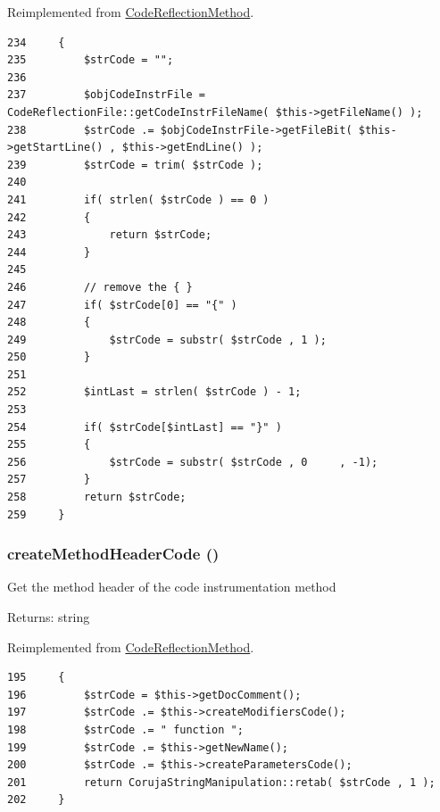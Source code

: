 Reimplemented from \hyperlink{class_code_reflection_method_e38c2891dc093dabb6b363a4de9ac495}{CodeReflectionMethod}.

\begin{Code}\begin{verbatim}234     {
235         $strCode = "";
236 
237         $objCodeInstrFile = CodeReflectionFile::getCodeInstrFileName( $this->getFileName() );
238         $strCode .= $objCodeInstrFile->getFileBit( $this->getStartLine() , $this->getEndLine() );
239         $strCode = trim( $strCode );
240 
241         if( strlen( $strCode ) == 0 )
242         {
243             return $strCode;
244         }
245         
246         // remove the { }
247         if( $strCode[0] == "{" )
248         {
249             $strCode = substr( $strCode , 1 );
250         }
251 
252         $intLast = strlen( $strCode ) - 1;
253 
254         if( $strCode[$intLast] == "}" )
255         {
256             $strCode = substr( $strCode , 0     , -1);
257         }
258         return $strCode;
259     }
\end{verbatim}
\end{Code}


\hypertarget{class_code_instrumentation_method_3d517292204047acfc6bb54cc09a38e3}{
\subsubsection[{createMethodHeaderCode}]{\setlength{\rightskip}{0pt plus 5cm}createMethodHeaderCode ()}}
\label{class_code_instrumentation_method_3d517292204047acfc6bb54cc09a38e3}


Get the method header of the code instrumentation method

\begin{Desc}
\item[Returns:]string \end{Desc}


Reimplemented from \hyperlink{class_code_reflection_method_3d517292204047acfc6bb54cc09a38e3}{CodeReflectionMethod}.

\begin{Code}\begin{verbatim}195     {
196         $strCode = $this->getDocComment();
197         $strCode .= $this->createModifiersCode();
198         $strCode .= " function ";
199         $strCode .= $this->getNewName();
200         $strCode .= $this->createParametersCode();
201         return CorujaStringManipulation::retab( $strCode , 1 );
202     }
\end{verbatim}
\end{Code}


